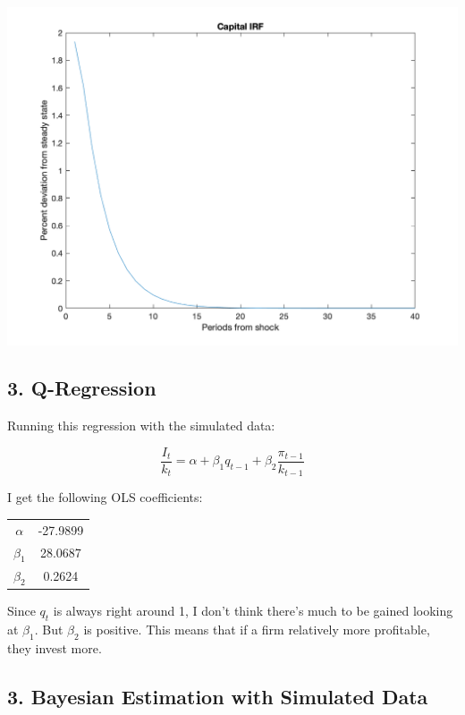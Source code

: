 \documentclass{article}
\begin{document}
\includegraphics[scale=.6]{p2_k_zero_gamma}

\subsection*{3. Q-Regression}

Running this regression with the simulated data:

$$
\frac{I_t}{k_t} = \alpha + \beta_1 q_{t-1} + \beta_2 \frac{\pi_{t-1}}{k_{t-1}}
$$

I get the following OLS coefficients:

\begin{table}[h!]
  \begin{center}
    \label{tab:table1}
    \begin{tabular}{c|c}
      \hline
      $\alpha$  & -27.9899 \\
      $\beta_1$ & 28.0687 \\
      $\beta_2$ & 0.2624
    \end{tabular}
  \end{center}
\end{table}

Since $q_t$ is always right around 1, I don't think there's much to be gained looking at $\beta_1$.  But $\beta_2$ is positive.  This means that if a firm relatively more profitable, they invest more.

\subsection*{3. Bayesian Estimation with Simulated Data}
\end{document}
